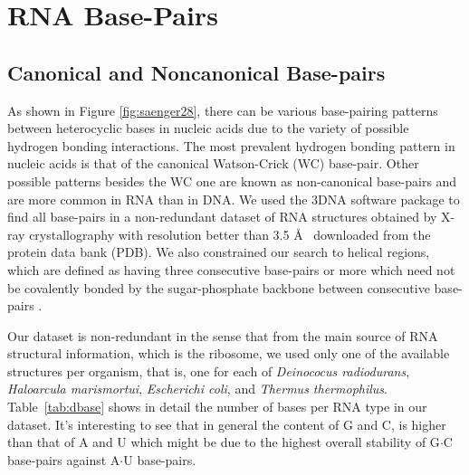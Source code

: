 \chapter{RNA Base-Pairs}
\label{basepairs} 

\section{Canonical and Noncanonical Base-pairs}
As  shown   in  Figure  \ref{fig:saenger28},  there   can  be  various
base-pairing patterns between heterocyclic  bases in nucleic acids due
to the  variety of possible  hydrogen bonding interactions.   The most
prevalent hydrogen  bonding pattern  in nucleic acids  is that  of the
canonical  Watson-Crick  (WC)  base-pair.   Other  possible  patterns
besides the WC one are known as non-canonical base-pairs and are more
common in  RNA than in DNA.   We used the  3DNA \cite{lu2003} software
package  to find  all base-pairs  in  a non-redundant  dataset of  RNA
structures  obtained by X-ray  crystallography with  resolution better
than 3.5  \AA~ downloaded from the  protein data bank  (PDB).  We also
constrained our search to helical regions, which are defined as having
three  consecutive base-pairs  or more  which need  not  be covalently
bonded by the  sugar-phosphate backbone between consecutive base-pairs
\cite{olson2009}.

Our dataset is  non-redundant in the sense that  from the main source
of RNA structural information, which is the ribosome, we used only one
of the  available structures  per organism, that  is, one for  each of
\textit{Deinococus   radiodurans},   \textit{Haloarcula  marismortui},
\textit{Escherichi          coli},         and         \textit{Thermus
  thermophilus}. Table~\ref{tab:dbase}  shows in detail  the number of
bases per  RNA type in  our dataset. It's  interesting to see  that in
general the content of  G and C, is higher than that  of A and U which
might be due to the  highest overall stability of G$\cdot$C base-pairs
against A$\cdot$U base-pairs.

